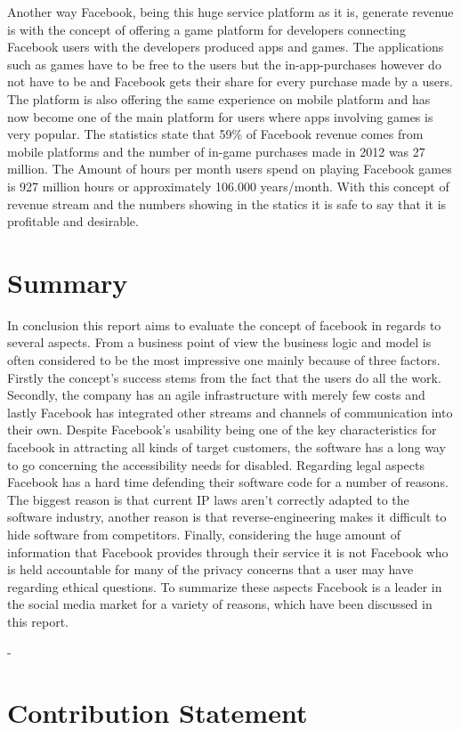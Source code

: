 \documentclass[conference]{IEEEtran}
\begin{document}
Another way Facebook, being this huge service platform as it is, generate revenue is with the concept of offering a game platform for developers connecting Facebook users with the developers produced apps and games. The applications such as games have to be free to the users but the in-app-purchases however do not have to be and Facebook gets their share for every purchase made by a users. The platform is also offering the same experience on mobile platform and has now become one of the main platform for users where apps involving games is very popular. The statistics state that 59\% of Facebook revenue comes from mobile platforms and the number of in-game purchases made in 2012 was 27 million. The Amount of hours per month users spend on playing Facebook games is 927 million hours or approximately 106.000 years/month. With this concept of revenue stream and the numbers showing in the statics it is safe to say that it is profitable and desirable.


\section{Summary}
\label{summary}
In conclusion this report aims to evaluate the concept of facebook in regards to several aspects. From a business point of view the business logic and model is often considered to be the most impressive one mainly because of three factors. Firstly the concept’s success stems from the fact that the users do all the work. Secondly, the company has an agile infrastructure with merely few costs and lastly Facebook has integrated other streams and channels of communication into their own. Despite Facebook’s usability being one of the key characteristics for facebook in attracting all kinds of target customers, the software has a long way to go concerning the accessibility needs for disabled. Regarding legal aspects Facebook has a hard time defending their software code for a number of reasons. The biggest reason is that current IP laws aren’t correctly adapted to the software industry, another reason is that reverse-engineering makes it difficult to hide software from competitors.
Finally, considering the huge amount of information that Facebook provides through their service it is not Facebook who is held accountable for many of the privacy concerns that a user may have regarding ethical questions. To summarize these aspects Facebook is a leader in the social media market for a variety of reasons, which have been discussed in this report.


-
\section{Contribution Statement}
\end{document}
